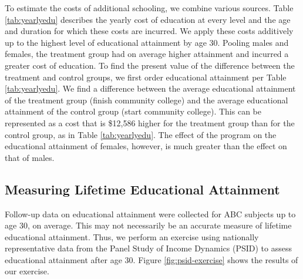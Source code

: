 \noindent To estimate the costs of additional schooling, we combine various sources. Table \ref{tab:yearlyedu}   describes the yearly cost of education at every level and the age and duration for which these costs are incurred. We apply these costs additively up to the highest level of educational attainment by age 30. Pooling males and females, the treatment group had on average higher attainment and incurred a greater cost of education. To find the present value of the difference between the treatment and control groups, we first order educational attainment per Table \ref{tab:yearlyedu}. We find a difference between the average educational attainment of the treatment group (finish community college) and the average educational attainment of the control group (start community college). This can be represented as a cost that is \$12,586 higher for the treatment group than for the control group, as in Table \ref{tab:yearlyedu}. The effect of the program on the educational attainment of females, however, is much greater than the effect on that of males.

\subsection{Measuring Lifetime Educational Attainment}

\noindent Follow-up data on educational attainment were collected for ABC subjects up to age 30, on average. This may not necessarily be an accurate measure of lifetime educational attainment. Thus, we perform an exercise using nationally representative data from the Panel Study of Income Dynamics (PSID) to assess educational attainment after age 30. Figure \ref{fig:psid-exercise} shows the results of our exercise. \\

